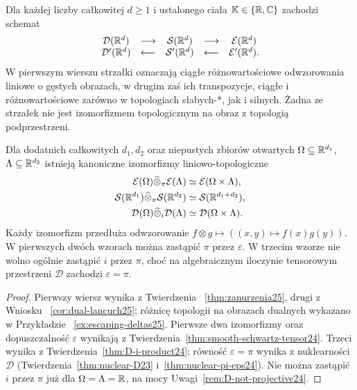 \begin{stwierdzenie}
\label{prop:summary25}
Dla każdej liczby całkowitej $d\ge1$ i ustalonego
ciała $\mathbb K\in\{\mathbb R,\mathbb C\}$ zachodzi schemat
\[
 \begin{array}{ccccc}
 \mathcal D(\mathbb R^d)&\longrightarrow&\mathcal S(\mathbb R^d)
 &\longrightarrow&\mathcal E(\mathbb R^d)\\
 \mathcal D'(\mathbb R^d)&\longleftarrow&\mathcal S'(\mathbb R^d)
 &\longleftarrow&\mathcal E'(\mathbb R^d).
 \end{array}
\]
W pierwszym wierszu strzałki oznaczają ciągłe
różnowartościowe odwzorowania liniowe o gęstych obrazach,
w drugim zaś ich transpozycje, ciągłe i różnowartościowe
zarówno w topologiach słabych-*, jak i silnych.
Żadna ze strzałek nie jest izomorfizmem topologicznym
na obraz z topologią podprzestrzeni.

Dla dodatnich całkowitych $d_1,d_2$ oraz niepustych
zbiorów otwartych $\Omega\subseteq\mathbb R^{d_1}$,
$\Lambda\subseteq\mathbb R^{d_2}$ istnieją kanoniczne
izomorfizmy liniowo-topologiczne
\[
\begin{aligned}
 \mathcal E(\Omega)\widehat\otimes_\pi\mathcal E(\Lambda)
 &\simeq\mathcal E(\Omega\times\Lambda),\\
 \mathcal S(\mathbb R^{d_1})\widehat\otimes_\pi\mathcal S(\mathbb R^{d_2})
 &\simeq\mathcal S(\mathbb R^{d_1+d_2}),\\
 \mathcal D(\Omega)\widehat\otimes_i\mathcal D(\Lambda)
 &\simeq\mathcal D(\Omega\times\Lambda).
\end{aligned}
\]
Każdy izomorfizm przedłuża odwzorowanie
$f\otimes g\mapsto ((x,y)\mapsto f(x)g(y))$.
W pierwszych dwóch wzorach można zastąpić $\pi$
przez $\varepsilon$. W trzecim wzorze nie wolno
ogólnie zastąpić $i$ przez $\pi$, choć na algebraicznym
iloczynie tensorowym przestrzeni $\mathcal D$
zachodzi $\varepsilon=\pi$.
\end{stwierdzenie}
\begin{proof}
Pierwszy wiersz wynika z Twierdzenia~
\ref{thm:zanurzenia25}, drugi z Wniosku~
\ref{cor:dual-lancuch25}; różnicę topologii
na obrazach dualnych wykazano w Przykładzie~
\ref{ex:escaping-deltas25}. Pierwsze dwa izomorfizmy
oraz dopuszczalność $\varepsilon$ wynikają z
Twierdzenia~\ref{thm:smooth-schwartz-tensor24}.
Trzeci wynika z Twierdzenia~\ref{thm:D-i-product24};
równość $\varepsilon=\pi$ wynika z nuklearności
$\mathcal D$ (Twierdzenia~\ref{thm:nuclear-D23}
i~\ref{thm:nuclear-pi-eps24}). Nie można zastąpić
$i$ przez $\pi$ już dla $\Omega=\Lambda=\mathbb R$,
na mocy Uwagi~\ref{rem:D-not-projective24}.
\end{proof}

